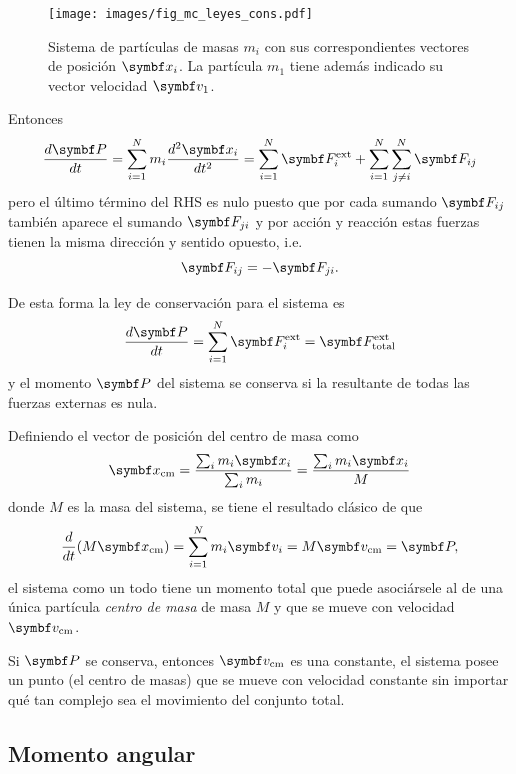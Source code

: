 \documentclass[10pt,oneside]{CBFT_book}
\begin{document}
\begin{figure}[hbt]
	\begin{center}
	\texttt{[image: images/fig\_mc\_leyes\_cons.pdf]}
	\end{center}
	\caption{Sistema de partículas de masas $m_i$ con sus correspondientes vectores de
	posición $\vb{x}_i$. La partícula $m_1$ tiene además indicado su vector velocidad $\vb{v}_1$.}
	\label{fig_mc_leyes_cons}
\end{figure} 

Entonces 
\[
	\dtot{\vb{P}}{t} = \Sum{i=1}{N} m_i \dtot[2]{\vb{x}_i}{t} = \Sum{i=1}{N} \vb{F}_i^\text{ext} + 
	\Sum{i=1}{N} \Sum{ j \neq i }{N} \vb{F}_{ij}
\]
pero el último término del RHS es nulo puesto que por cada sumando $ \vb{F}_{ij} $ también aparece el sumando 
$ \vb{F}_{ji} $ y por acción y reacción estas fuerzas tienen la misma dirección y sentido opuesto, i.e.
\[
	\vb{F}_{ij} = - \vb{F}_{ji}.
\]

De esta forma la ley de conservación para el sistema es 
\[
	\dtot{\vb{P}}{t} = \Sum{i=1}{N} \vb{F}_i^\text{ext} = \vb{F}^\text{ext}_\text{total}
\]
y el momento $ \vb{P} $ del sistema se conserva si la resultante de todas las fuerzas externas es nula. 

Definiendo el vector de posición del centro de masa como 
\[
	\vb{x}_\text{cm} = \frac{\sum_i m_i \vb{x}_i }{\sum_i m_i} = \frac{\sum_i m_i \vb{x}_i }{M}
\]
donde $ M $ es la masa del sistema, se tiene el resultado clásico de que
\[
	\dtot{}{t}( M \vb{x}_\text{cm} ) = \Sum{i=1}{N} m_i \vb{v}_i = M \vb{v}_\text{cm} = \vb{P},
\]
el sistema como un todo tiene un momento total que puede asociársele al de una única partícula {\it centro de masa} de 
masa $M$ y que se mueve con velocidad $ \vb{v}_\text{cm} $.

Si $\vb{P}$ se conserva, entonces $ \vb{v}_\text{cm} $ es una constante, el sistema posee un punto (el centro de masas) 
que se mueve con velocidad constante sin importar qué tan complejo sea el movimiento del conjunto total.

\subsection{Momento angular}
\end{document}
